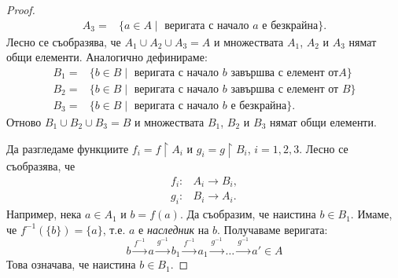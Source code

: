 \begin{proof}
\begin{align*}
  A_3 = & \{a\in A \mid \mbox{ веригата с начало $a$ е безкрайна} \}.
\end{align*}
Лесно се съобразява, че $A_1\cup A_2\cup A_3 = A$ и 
множествата $A_1$, $A_2$ и $A_3$ нямат общи елементи.
Аналогично дефинираме:
\begin{align*}
  B_1 = & \{b\in B \mid \mbox{ веригата с начало $b$ завършва с елемент от} A\}\\
  B_2 = & \{b\in B \mid \mbox{ веригата с начало $b$ завършва с елемент от } B\}\\
  B_3 = & \{b\in B \mid \mbox{ веригата с начало $b$ е безкрайна} \}.
\end{align*}
Отново $B_1\cup B_2\cup B_3 = B$ и множествата $B_1$, $B_2$ и $B_3$ нямат общи елементи.

Да разгледаме функциите $f_i = f\upharpoonright{A_i}$ и $g_i = g\upharpoonright{B_i}$, $i = 1,2,3$. 
Лесно се съобразява, че 
\begin{align*}
  f_i:& A_i\to B_i,\\
  g_i:& B_i\to A_i.
\end{align*}
Например, нека $a \in A_1$ и $b = f(a)$. Да съобразим, че наистина $b \in B_1$.
Имаме, че $f^{-1}(\{b\}) = \{a\}$, т.е. $a$ е {\em наследник} на $b$.
Получаваме веригата:
\[b \stackrel{f^{-1}}{\longrightarrow}a \stackrel{g^{-1}}{\longrightarrow} b_1 \stackrel{f^{-1}}{\longrightarrow} a_1 \stackrel{g^{-1}}{\longrightarrow}\dots \stackrel{g^{-1}}{\longrightarrow}a' \in A\]
Това означава, че наистина $b \in B_1$.


\end{proof}
